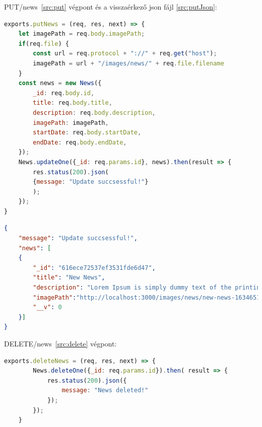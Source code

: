 PUT/news~\ref{src:put} végpont és a visszaérkező json fájl \ref{src:putJson}:

\begin{lstlisting}[language=JavaScript]
exports.putNews = (req, res, next) => {
	let imagePath = req.body.imagePath;
	if(req.file) {
		const url = req.protocol + "://" + req.get("host");
		imagePath = url + "/images/news/" + req.file.filename
	}
	const news = new News({
		_id: req.body.id,
		title: req.body.title,
		description: req.body.description,
		imagePath: imagePath,
		startDate: req.body.startDate,
		endDate: req.body.endDate,
	});
	News.updateOne({_id: req.params.id}, news).then(result => {
		res.status(200).json(
		{message: "Update succsessful!"}
		);
	});
}
\end{lstlisting}

\begin{lstlisting}[language={JSON}]
{
	"message": "Update succsessful!",
	"news": [
	{
		"_id": "616ece72537ef3531fde6d47",
		"title": "New News",
		"description": "Lorem Ipsum is simply dummy text of the printing and typesetting industry. Lorem Ipsum has been the industry's standard dummy text ever since the 1500s, when an unknown printer took a galley of type and scrambled it to make a type specimen book. It has survived not only five centuries, but also the leap into electronic typesetting, remaining essentially unchanged.",
		"imagePath":"http://localhost:3000/images/news/new-news-1634651762652.jpg",
		"__v": 0
	}]
}
\end{lstlisting}

DELETE/news~\ref{src:delete} végpont:

\begin{lstlisting}[language=JavaScript]
	exports.deleteNews = (req, res, next) => {
		News.deleteOne({_id: req.params.id}).then( result => {
			res.status(200).json({
				message: "News deleted!"
			});
		});
	}
\end{lstlisting}




